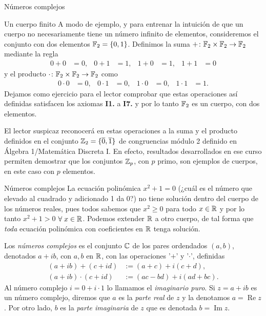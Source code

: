 \begin{chapter}{N\'umeros complejos}
    
    \begin{subsection}{Un cuerpo finito}
        A modo de ejemplo, y para entrenar la intuición de que un cuerpo no necesariamente tiene un número infinito de elementos, consideremos el conjunto con dos elementos $\mathbb F_2=\{0,1\}$. Definimos la suma $+\colon\mathbb F_2\times \mathbb F_2\to \mathbb F_2$ mediante la regla
        \begin{align*}
        0+0&=0, & 0+1&=1, & 1+0&=1, & 1+1&=0
        \end{align*}
        y el producto $\cdot \colon\mathbb F_2\times \mathbb F_2\to \mathbb F_2$ como 
        \begin{align*}
        0\cdot 0&=0, & 0\cdot 1&=0, & 1\cdot 0&=0, & 1\cdot 1&=1.
        \end{align*}
        Dejamos como ejercicio para el lector comprobar que estas operaciones así definidas satisfacen los axiomas \textbf{I1.} a \textbf{I7.} y por lo tanto $\mathbb F_2$ es un cuerpo, con dos elementos.
        
        \begin{obs*}
            El lector suspicaz reconocerá en estas operaciones a la suma y el producto definidos en el conjunto $\mathbb Z_2=\{\overline{0},\overline{1}\}$ de congruencias módulo 2  definido en Álgebra 1/Matemática Discreta I. En efecto, resultados desarrollados en ese curso permiten demostrar que los conjuntos $\mathbb Z_p$, con $p$ primo, son ejemplos de cuerpos, en este caso con $p$ elementos.
        \end{obs*}
        
    \end{subsection}
    
    
    \begin{section}{N\'umeros complejos}\label{seccion-numeros-complejos}
        La ecuación polinómica $x^2 + 1 =0$ (¿cuál es el número que elevado  al cuadrado y adicionado 1 da 0?) no tiene solución dentro del cuerpo de los números reales,  pues todos sabemos que  $x^2 \ge 0$ para todo $x \in \mathbb R$ y por lo tanto $x^2 + 1 >0$ $\forall\; x \in \mathbb R$. Podemos extender $\mathbb R$ a otro cuerpo,  de tal forma que \textit{toda} ecuación polinómica con coeficientes en $\mathbb R$ tenga solución. 
        
        \begin{definicion} 
            Los \textit{números complejos} es el conjunto $\mathbb C$  de los pares ordendados $(a,b)$,  denotados $a+ib$, con $a, b$  en $\mathbb R$, con las operaciones '$+$' y '$\cdot$', definidas
            \begin{align}
            (a+ib)+ (c+id) &:= (a+c) + i(c+d), \label{sumacompleja} \\
            (a+ib) \cdot (c+id) &:= (ac -bd) + i(ad+bc). \label{productocomplejo}
            \end{align}
            Al número complejo $i = 0 + i\cdot 1$ lo llamamos el \textit{imaginario puro}.  Si $z= a + ib$  es un número complejo,  diremos que $a$ es la \textit{parte real} de $z$ y  la denotamos $a = \operatorname{Re} z$. Por otro lado,  $b$ es la \textit{parte  imaginaria} de $z$ que es denotada $b = \operatorname{Im} z$.
        \end{definicion}
        

\end{section}
\end{chapter}
